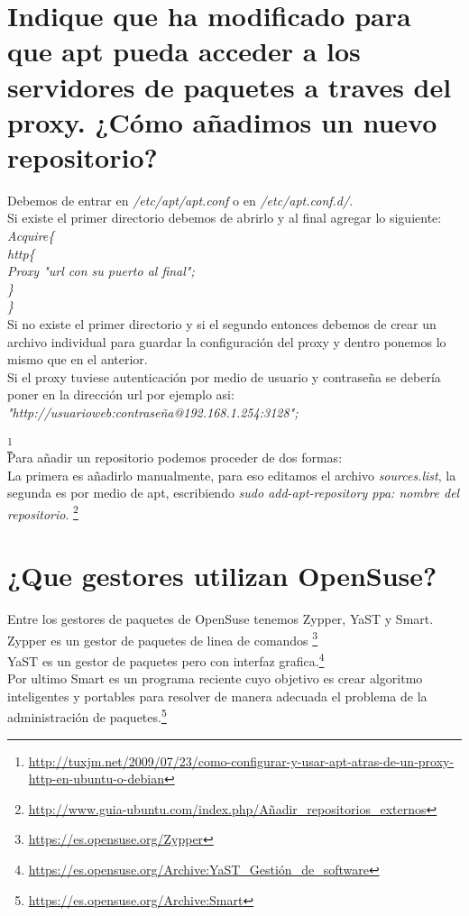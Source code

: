 \section{Indique que ha modificado para que apt pueda acceder a los servidores de paquetes a traves del proxy. ¿Cómo añadimos un nuevo repositorio?}
Debemos de entrar en \textit{/etc/apt/apt.conf} o en \textit{/etc/apt.conf.d/}.
\\Si existe el primer directorio debemos de abrirlo y al final agregar lo siguiente:
\textit{\\Acquire\{
\\http\{
\\Proxy "url con su puerto al final";
\\\}
\\\}}
\\Si no existe el primer directorio y si el segundo entonces debemos de crear un archivo individual para guardar la configuración del proxy y dentro ponemos lo mismo que en el anterior. 
\\Si el proxy tuviese autenticación por medio de usuario y contraseña se debería poner en la dirección url por ejemplo asi:
\\ \textit{"http://usuarioweb:contraseña@192.168.1.254:3128";}

\footnote{\url{http://tuxjm.net/2009/07/23/como-configurar-y-usar-apt-atras-de-un-proxy-http-en-ubuntu-o-debian}}
\\Para añadir un repositorio podemos proceder de dos formas:
\\La primera es añadirlo manualmente, para eso editamos el archivo \textit{sources.list}, la segunda es por medio de apt, escribiendo \textit{sudo add-apt-repository ppa: nombre del repositorio}. \footnote{\url{http://www.guia-ubuntu.com/index.php/Añadir_repositorios_externos}}
\section{¿Que gestores utilizan OpenSuse?}
Entre los gestores de paquetes de OpenSuse tenemos Zypper, YaST y Smart.
\\Zypper es un gestor de paquetes de linea de comandos \footnote{\url{https://es.opensuse.org/Zypper}}
\\YaST es un gestor de paquetes pero con interfaz grafica.\footnote{\url{https://es.opensuse.org/Archive:YaST_Gestión_de_software}}
\\Por ultimo Smart es un programa reciente cuyo objetivo es crear algoritmo inteligentes y portables para resolver de manera adecuada el problema de la administración de paquetes.\footnote{\url{https://es.opensuse.org/Archive:Smart}}

